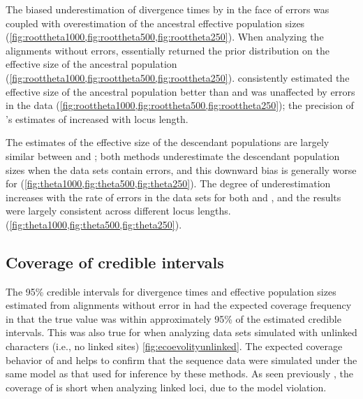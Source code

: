 The biased underestimation of divergence times by \ecoevolity in the face of
errors was coupled with overestimation of the ancestral effective population
sizes (\cref{fig:roottheta1000,fig:roottheta500,fig:roottheta250}).
When analyzing the alignments without errors, \ecoevolity essentially returned
the prior distribution on the effective size of the ancestral population
(\cref{fig:roottheta1000,fig:roottheta500,fig:roottheta250}).
\beast consistently estimated the effective size of
the ancestral population better than \ecoevolity and was unaffected by errors
in the data
(\cref{fig:roottheta1000,fig:roottheta500,fig:roottheta250});
the precision of \beast's estimates of \rootpopsize increased with locus
length.

The estimates of the effective size of the descendant populations
are largely similar between \beast and \ecoevolity;
both methods underestimate the descendant population sizes when
the data sets contain errors, and this downward bias is generally
worse for \ecoevolity
(\cref{fig:theta1000,fig:theta500,fig:theta250}).
The degree of underestimation increases with the rate of errors in the data
sets for both \beast and \ecoevolity, and the results were largely consistent
across different locus lengths.
(\cref{fig:theta1000,fig:theta500,fig:theta250}).



\subsection{Coverage of credible intervals}
The 95\% credible intervals for divergence times and effective population sizes
estimated from alignments without error in \beast had the expected coverage
frequency in that the true value was within approximately 95\% of the estimated
credible intervals. 
This was also true for \ecoevolity when analyzing data sets simulated with
unlinked characters (i.e., no linked sites) \cref{fig:ecoevolityunlinked}.
The expected coverage behavior of \beast and \ecoevolity helps to confirm that
the sequence data were simulated under the same model as that used for
inference by these methods. 
As seen previously \citep{Oaks2018ecoevolity}, the coverage of \ecoevolity is
short when analyzing linked loci, due to the model violation.

